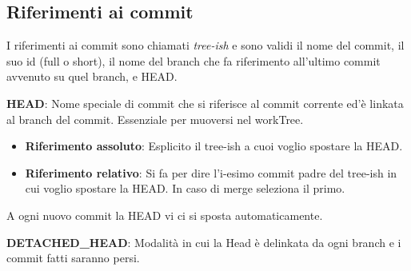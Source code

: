 \subsection{Riferimenti ai commit}
I riferimenti ai commit sono chiamati \textit{tree-ish} e sono validi il nome del commit, il suo id (full o short), il nome del branch che fa riferimento all'ultimo commit avvenuto su quel branch, e HEAD.

\bigskip

\textbf{HEAD}: Nome speciale di commit che si riferisce al commit corrente ed'è linkata al branch del commit. Essenziale per muoversi nel workTree.

\begin{itemize}
	\item \textbf{Riferimento assoluto}: Esplicito il tree-ish a cuoi voglio spostare la HEAD.

	\item \textbf{Riferimento relativo}: Si fa  per dire l'i-esimo commit padre del tree-ish in cui voglio spostare la HEAD. In caso di merge seleziona il primo.
\end{itemize}

A ogni nuovo commit la HEAD vi ci si sposta automaticamente.

\bigskip

\textbf{DETACHED\_HEAD}: Modalità in cui la Head è delinkata da ogni branch e i commit fatti saranno persi.

